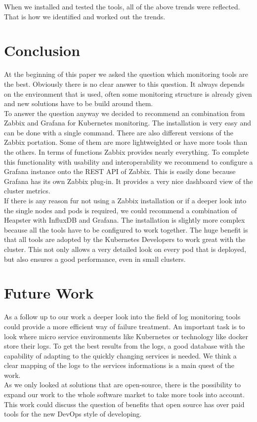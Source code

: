 When we installed and tested the tools, all of the above trends were reflected. That is how we identified and worked out the trends. 


\section{Conclusion}
At the beginning of this paper we asked the question which monitoring tools are the best. Obviously there is no clear answer to this question. It always depends on the environment that is used, often some monitoring structure is already given and new solutions have to be build around them.\\
To answer the question anyway we decided to recommend an combination from Zabbix and Grafana for Kubernetes monitoring. The installation is very easy and can be done with a single command. There are also different versions of the Zabbix portation. Some of them are more lightweighted or have more tools than the others. In terms of functions Zabbix provides nearly everything. To complete this functionality with usability and interoperability we recommend to configure a Grafana instance onto the REST API of Zabbix. This is easily done because Grafana has its own Zabbix plug-in. It provides a very nice dashboard view of the cluster metrics.
\\
If there is any reason fur not using a Zabbix installation or if a deeper look into the single nodes and pods is required, we could recommend a combination of Heapster with InfluxDB and Grafana. The installation is slightly more complex because all the tools have to be configured to work together. The huge benefit is that all tools are adopted by the Kubernetes Developers to work great with the cluster. This not only allows a very detailed look on every pod that is deployed, but also ensures a good performance, even in small clusters. 

\section{Future Work}
As a follow up to our work a deeper look into the field of log monitoring tools could provide a more efficient way of failure treatment. An important task is to look where micro service environments like Kubernetes or technology like docker store their logs. To get the best results from the logs, a good database with the capability of adapting to the quickly changing services is needed. We think a clear mapping of the logs to the services informations is a main quest of the work.\\
As we only looked at solutions that are open-source, there is the possibility to expand our work to the whole software market to take more tools into account. This work could discuss the question of benefits that open source has over paid tools for the new DevOps style of developing.

